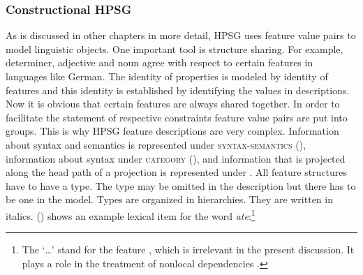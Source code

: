 \documentclass[output=paper]{langsci/langscibook}
\begin{document}

\subsubsection{Constructional HPSG}
\label{sec-constructional-hpsg}

As is discussed in other chapters in more detail, HPSG uses feature value pairs to model linguistic
objects. One important tool is structure sharing. For example, determiner, adjective and noun agree
with respect to certain features in languages like German. The identity of properties is modeled by
identity of features and this identity is established by identifying the values in descriptions. Now
it is obvious that certain features are always shared together. In order to facilitate the statement
of respective constraints feature value pairs are put into groups. This is why HPSG feature
descriptions are very complex. Information about syntax and semantics is represented under
\textsc{syntax-semantics} (\synsem), information about syntax under \textsc{category} (\cat), and
information that is projected along the head path of a projection is represented under \head. All
feature structures have to have a type. The type may be omitted in the description but there has to
be one in the model. Types are organized in hierarchies. They are written in italics. ()
shows an example lexical item for the word \emph{ate}:\footnote{
  The `\ldots' stand for the feature \local, which is irrelevant in the present discussion. It plays
  a role in the treatment of nonlocal dependencies .
}
\end{document}
